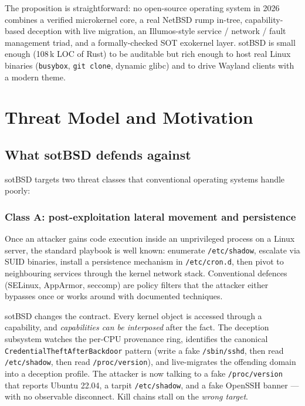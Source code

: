 \documentclass[11pt,a4paper]{article}
\begin{document}
The proposition is straightforward: no open-source operating system
in 2026 combines a verified microkernel core, a real NetBSD rump
in-tree, capability-based deception with live migration, an Illumos-style
service / network / fault management triad, and a formally-checked SOT
exokernel layer. sotBSD is small enough (108\,k LOC of Rust) to be
auditable but rich enough to host real Linux binaries
(\texttt{busybox}, \texttt{git clone}, dynamic glibc) and to drive
Wayland clients with a modern theme.

\section{Threat Model and Motivation}

\subsection{What sotBSD defends against}

sotBSD targets two threat classes that conventional operating systems
handle poorly:

\subsubsection*{Class A: post-exploitation lateral movement and
persistence}

Once an attacker gains code execution inside an unprivileged process
on a Linux server, the standard playbook is well known: enumerate
\texttt{/etc/shadow}, escalate via SUID binaries, install a persistence
mechanism in \texttt{/etc/cron.d}, then pivot to neighbouring services
through the kernel network stack. Conventional defences (SELinux,
AppArmor, seccomp) are policy filters that the attacker either bypasses
once or works around with documented techniques.

sotBSD changes the contract. Every kernel object is accessed through a
capability, and \emph{capabilities can be interposed} after the fact.
The deception subsystem watches the per-CPU provenance ring, identifies
the canonical \texttt{CredentialTheftAfterBackdoor} pattern (write a
fake \texttt{/sbin/sshd}, then read \texttt{/etc/shadow}, then read
\texttt{/proc/version}), and live-migrates the offending domain into
a deception profile. The attacker is now talking to a fake
\texttt{/proc/version} that reports Ubuntu 22.04, a tarpit
\texttt{/etc/shadow}, and a fake OpenSSH banner --- with no observable
disconnect. Kill chains stall on the \emph{wrong target}.
\end{document}

